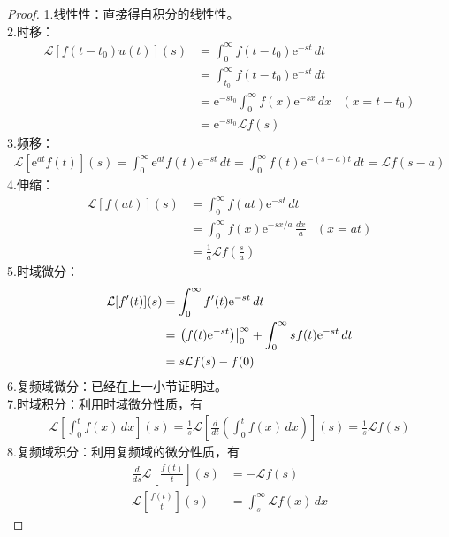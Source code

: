\begin{proof}
    1.线性性：直接得自积分的线性性。\\
    2.时移：\begin{align*}
        \mathcal{L} [f(t-t_0)u(t)](s)&=\int_0^{\infty}f(t-t_0)\mathrm{e}^{-st}\,dt\\
        &=\int_{t_0}^{\infty}f(t-t_0)\mathrm{e}^{-st}\,dt\\
        &=\mathrm{e}^{-s t_0}\int_0^{\infty}f(x)\mathrm{e}^{-s x}\,dx&( x=t-t_0)\\
        &=\mathrm{e}^{-s t_0}\mathcal{L} f(s)
    \end{align*}
    3.频移：\begin{align*}
        \mathcal{L} [\mathrm{e}^{a t}f(t)](s)=\int_0^{\infty}\mathrm{e}^{a t}f(t)\mathrm{e}^{-st}\,dt=\int_0^{\infty}f(t)\mathrm{e}^{-(s-a)t}\,dt=\mathcal{L} f(s-a)
    \end{align*}
    4.伸缩：\begin{align*}
        \mathcal{L} [f(at)](s)&=\int_0^{\infty}f(at)\mathrm{e}^{-st}\,dt\\
        &=\int_0^{\infty}f(x)\mathrm{e}^{-sx/a}\,\frac{dx}{a}&(x=at)\\
        &=\frac{1}{a}\mathcal{L} f\left(\frac{s}{a}\right)
    \end{align*}
    5.时域微分：\begin{align*}
        \mathcal{L} [f'(t)](s)&=\int_0^{\infty}f'(t)\mathrm{e}^{-st}\,dt\\
        &=\left.\left(f(t)\mathrm{e}^{-st}\right)\right|_{0}^{\infty}+\int_0^{\infty}sf(t)\mathrm{e}^{-st}\,dt\\
        &=s\mathcal{L} f(s)-f(0)
    \end{align*}
    6.复频域微分：已经在上一小节证明过。\\
    7.时域积分：利用时域微分性质，有
    \begin{align*}
        \mathcal{L} \left[\int_0^t f(x)\,dx\right](s)=\frac{1}{s}\mathcal{L} \left[\frac{d}{dt}\left(\int_0^t f(x)\,dx\right)\right](s)=\frac{1}{s}\mathcal{L} f(s)
    \end{align*}
    8.复频域积分：利用复频域的微分性质，有
    \begin{align*}
        \frac{d}{ds}\mathcal{L} \left[\frac{f(t)}{t}\right](s)&=-\mathcal{L} f(s)\\
        \mathcal{L} \left[\frac{f(t)}{t}\right](s)&=\int_s^{\infty}\mathcal{L}f(x)\,dx
    \end{align*}
\end{proof}

